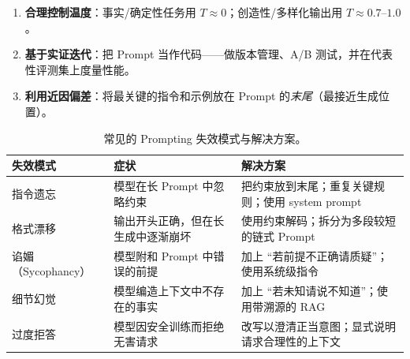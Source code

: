 \begin{keybox}
\begin{enumerate}
  \item \textbf{合理控制温度}：事实/确定性任务用 $T \approx 0$；创造性/多样化输出用 $T \approx 0.7$--$1.0$。
  \item \textbf{基于实证迭代}：把 Prompt 当作代码——做版本管理、A/B 测试，并在代表性评测集上度量性能。
  \item \textbf{利用近因偏差}：将最关键的指令和示例放在 Prompt 的\emph{末尾}（最接近生成位置）。
\end{enumerate}
\end{keybox}

\begin{table}[ht!]
\centering\small
\caption{常见的 Prompting 失效模式与解决方案。}
\noindent\begin{tabularx}{\linewidth}{@{}l Z{0.81} Z{1.19}@{}}
\toprule
\textbf{失效模式} & \textbf{症状} & \textbf{解决方案} \\
\midrule
指令遗忘 & 模型在长 Prompt 中忽略约束 & 把约束放到末尾；重复关键规则；使用 system prompt \\
格式漂移 & 输出开头正确，但在长生成中逐渐崩坏 & 使用约束解码；拆分为多段较短的链式 Prompt \\
谄媚（Sycophancy） & 模型附和 Prompt 中错误的前提 & 加上 ``若前提不正确请质疑''；使用系统级指令 \\
细节幻觉 & 模型编造上下文中不存在的事实 & 加上 ``若未知请说不知道''；使用带溯源的 RAG \\
过度拒答 & 模型因安全训练而拒绝无害请求 & 改写以澄清正当意图；显式说明请求合理性的上下文 \\
\bottomrule
\end{tabularx}
\end{table}


